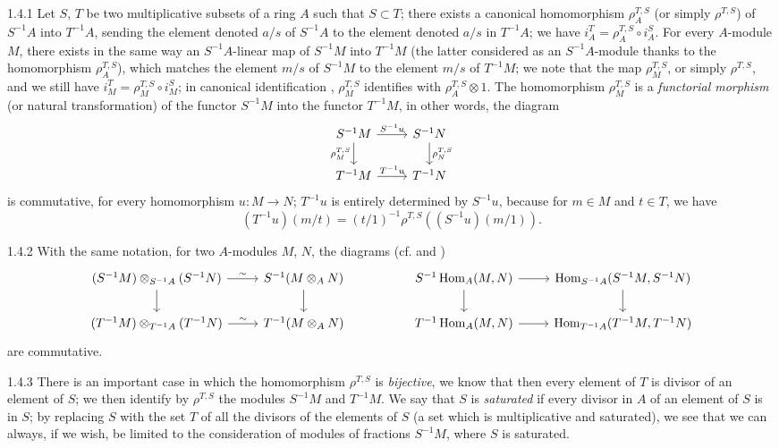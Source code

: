 
\begin{env}{1.4.1}
\label{env-0.1.4.1}
Let $S$, $T$ be two multiplicative subsets of a ring $A$ such that $S\subset T$; there exists a canonical
homomorphism $\rho_A^{T,S}$ (or simply $\rho^{T,S}$) of $S^{-1}A$ into  $T^{-1}A$, sending the
element denoted $a/s$ of $S^{-1}A$ to the element denoted $a/s$ in $T^{-1}A$; we have
${i_A^T=\rho_A^{T,S}\circ i_A^S}$. For every $A$-module $M$, there exists in the same way an
$S^{-1}A$-linear map of $S^{-1}M$ into $T^{-1}M$ (the latter considered as an $S^{-1}A$-module thanks
to the homomorphism $\rho_A^{T,S}$), which matches the element $m/s$ of $S^{-1}M$ to the element $m/s$
of $T^{-1}M$; we note that the map $\rho_M^{T,S}$, or simply $\rho^{T,S}$, and we still have
$i_M^T=\rho_M^{T,S}\circ i_M^S$; in canonical identification , $\rho_M^{T,S}$ identifies with
$\rho_A^{T,S}\otimes 1$. The homomorphism $\rho_M^{T,S}$ is a \emph{functorial morphism} (or natural
transformation) of the functor $S^{-1}M$ into the functor $T^{-1}M$, in other words, the diagram
\[
  \begin{tikzcd}
  S^{-1}M\ar[r,"S^{-1}u"]\ar[d,"\rho_M^{T,S}"'] & S^{-1}N\ar[d,"\rho_N^{T,S}"]\\
  T^{-1}M\ar[r,"T^{-1}u"] & T^{-1}N
  \end{tikzcd}
\]
is commutative, for every homomorphism $u\colon M\to N$; $T^{-1}u$ is entirely determined by
$S^{-1}u$, because for $m\in M$ and $t\in T$, we have
\[
  (T^{-1}u)(m/t)=(t/1)^{-1}\rho^{T,S}((S^{-1}u)(m/1)).
\]
\end{env}

\begin{env}{1.4.2}
\label{env-0.1.4.2}
With the same notation, for two $A$-modules $M$, $N$, the diagrams (cf.  and )
\[
  \begin{tikzcd}
    (S^{-1}M)\otimes_{S^{-1}A}(S^{-1}N)\ar[r,"\sim"]\ar[d] & S^{-1}(M\otimes_A N)\ar[d] & &
    S^{-1}\Hom_A(M,N)\ar[r]\ar[d] & \Hom_{S^{-1}A}(S^{-1}M,S^{-1}N)\ar[d]\\
    (T^{-1}M)\otimes_{T^{-1}A}(T^{-1}N)\ar[r,"\sim"] & T^{-1}(M\otimes_A N) & &
    T^{-1}\Hom_A(M,N)\ar[r] & \Hom_{T^{-1}A}(T^{-1}M,T^{-1}N)
  \end{tikzcd}
\]
are commutative.
\end{env}

\begin{env}{1.4.3}
\label{env-0.1.4.3}
There is an important case in which the homomorphism $\rho^{T,S}$ is \emph{bijective},
we know that then every element of $T$ is divisor of an element of $S$; we then identify by
$\rho^{T,S}$ the modules $S^{-1}M$ and $T^{-1}M$. We say that $S$ is \emph{saturated} if every divisor
in $A$ of an element of $S$ is in $S$; by replacing $S$ with  the set $T$ of all the divisors of the
elements of $S$ (a set which is multiplicative and saturated), we see that we can always, if we wish,
be limited to the consideration of modules of fractions $S^{-1}M$, where $S$ is saturated.
\end{env}

